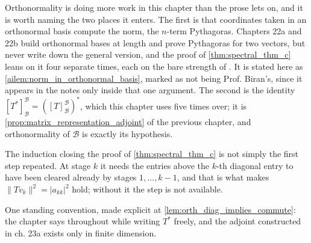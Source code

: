 
\begin{ainote}
Orthonormality is doing more work in this chapter than the prose lets on, and it
is worth naming the two places it enters. The first is that coordinates taken in
an orthonormal basis compute the norm, the $n$-term Pythagoras. Chapters 22a and
22b build orthonormal bases at length and prove Pythagoras for two vectors, but
never write down the general version, and the proof of
\cref{thm:spectral_thm_c} leans on it four separate times, each on the bare
strength of . It is stated here as
\cref{ailem:norm_in_orthonormal_basis}, marked as not being Prof. Biran's, since
it appears in the notes only inside that one argument. The second is the
identity $[T^*]_{\mathcal{B}}^{\mathcal{B}} = ([T]_{\mathcal{B}}^{\mathcal{B}})^*$,
which this chapter uses five times over; it is
\cref{prop:matrix_representation_adjoint} of the previous chapter, and
orthonormality of $\mathcal{B}$ is exactly its hypothesis.

The induction closing the proof of \cref{thm:spectral_thm_c} is not simply the
first step repeated. At stage $k$ it needs the entries above the $k$-th diagonal
entry to have been cleared already by stages $1, \dots, k-1$, and that is what
makes $\|Tv_k\|^2 = |a_{kk}|^2$ hold; without it the step is not available.

One standing convention, made explicit at \cref{lem:orth_diag_implies_commute}:
the chapter says  throughout while writing $T^*$ freely,
and the adjoint constructed in ch. 23a exists only in finite dimension.
\end{ainote}


